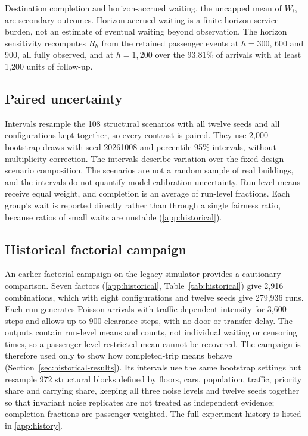 Destination completion and horizon-accrued waiting, the uncapped mean of $W_i$, are secondary outcomes. Horizon-accrued waiting is a finite-horizon service burden, not an estimate of eventual waiting beyond observation. The horizon sensitivity recomputes $R_h$ from the retained passenger events at $h=300$, 600 and 900, all fully observed, and at $h=1{,}200$ over the 93.81\% of arrivals with at least 1,200 units of follow-up.

\subsection{Paired uncertainty}\label{paired-uncertainty-and-fairness}

Intervals resample the 108 structural scenarios with all twelve seeds and all configurations kept together, so every contrast is paired. They use 2,000 bootstrap draws with seed 20261008 and percentile 95\% intervals, without multiplicity correction. The intervals describe variation over the fixed design-scenario composition. The scenarios are not a random sample of real buildings, and the intervals do not quantify model calibration uncertainty. Run-level means receive equal weight, and completion is an average of run-level fractions. Each group's wait is reported directly rather than through a single fairness ratio, because ratios of small waits are unstable (\ref{app:historical}).

\subsection{Historical factorial campaign}\label{historical-factorial-campaign}

An earlier factorial campaign on the legacy simulator provides a cautionary comparison. Seven factors (\ref{app:historical}, Table~\ref{tab:historical}) give 2,916 combinations, which with eight configurations and twelve seeds give 279,936 runs. Each run generates Poisson arrivals with traffic-dependent intensity for 3,600 steps and allows up to 900 clearance steps, with no door or transfer delay. The outputs contain run-level means and counts, not individual waiting or censoring times, so a passenger-level restricted mean cannot be recovered. The campaign is therefore used only to show how completed-trip means behave (Section~\ref{sec:historical-results}). Its intervals use the same bootstrap settings but resample 972 structural blocks defined by floors, cars, population, traffic, priority share and carrying share, keeping all three noise levels and twelve seeds together so that invariant noise replicates are not treated as independent evidence; completion fractions are passenger-weighted. The full experiment history is listed in \ref{app:history}.

